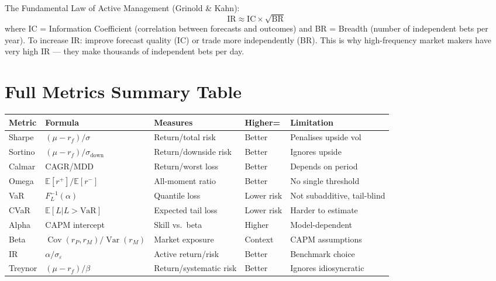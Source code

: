 \documentclass[12pt,a4paper,openany]{report}
\theoremstyle{definition}
\newcommand{\E}{\mathbb{E}}
\newcommand{\Var}{\operatorname{Var}}
\newcommand{\Cov}{\operatorname{Cov}}
\begin{document}
The Fundamental Law of Active Management (Grinold \& Kahn):
\begin{equation}
  \text{IR} \approx \text{IC} \times \sqrt{\text{BR}}
\end{equation}
where IC = Information Coefficient (correlation between forecasts and outcomes) and BR = Breadth (number of independent bets per year). To increase IR: improve forecast quality (IC) or trade more independently (BR). This is why high-frequency market makers have very high IR — they make thousands of independent bets per day.

\section{Full Metrics Summary Table}

\begin{center}
\begin{tabular}{lllll}
\toprule
\textbf{Metric} & \textbf{Formula} & \textbf{Measures} & \textbf{Higher=} & \textbf{Limitation} \\
\midrule
Sharpe  & $(\mu-r_f)/\sigma$ & Return/total risk & Better & Penalises upside vol \\
Sortino & $(\mu-r_f)/\sigma_{\text{down}}$ & Return/downside risk & Better & Ignores upside \\
Calmar  & CAGR/MDD & Return/worst loss & Better & Depends on period \\
Omega   & $\E[r^+]/\E[r^-]$ & All-moment ratio & Better & No single threshold \\
VaR     & $F_L^{-1}(\alpha)$ & Quantile loss & Lower risk & Not subadditive, tail-blind \\
CVaR    & $\E[L|L>\text{VaR}]$ & Expected tail loss & Lower risk & Harder to estimate \\
Alpha   & CAPM intercept & Skill vs.\ beta & Higher & Model-dependent \\
Beta    & $\Cov(r_P,r_M)/\Var(r_M)$ & Market exposure & Context & CAPM assumptions \\
IR      & $\alpha/\sigma_\varepsilon$ & Active return/risk & Better & Benchmark choice \\
Treynor & $(\mu-r_f)/\beta$ & Return/systematic risk & Better & Ignores idiosyncratic \\
\bottomrule
\end{tabular}
\end{center}
\end{document}
